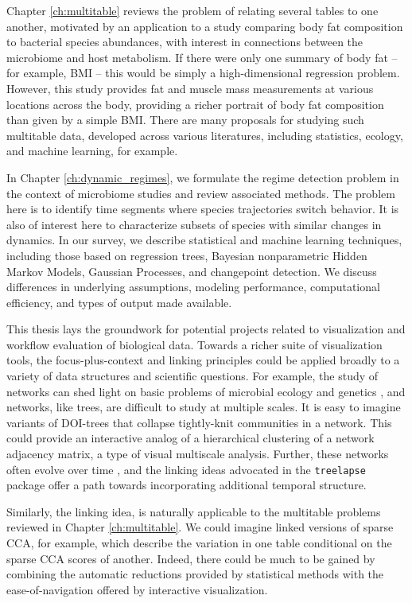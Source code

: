 Chapter \ref{ch:multitable} reviews the problem of relating several tables to
one another, motivated by an application to a study comparing body fat
composition to bacterial species abundances, with interest in connections
between the microbiome and host metabolism. If there were only one summary of
body fat -- for example, BMI -- this would be simply a high-dimensional regression
problem. However, this study provides fat and muscle mass measurements at
various locations across the body, providing a richer portrait of body
fat composition than given by a simple BMI. There are many proposals for studying such
multitable data, developed across various literatures, including statistics,
ecology, and machine learning, for example.

In Chapter \ref{ch:dynamic_regimes}, we formulate the regime detection problem
in the context of microbiome studies and review associated methods. The problem
here is to identify time segments where species trajectories switch behavior. It
is also of interest here to characterize subsets of species with similar changes
in dynamics. In our survey, we describe statistical and machine learning
techniques, including those based on regression trees, Bayesian nonparametric
Hidden Markov Models, Gaussian Processes, and changepoint detection. We discuss
differences in underlying assumptions, modeling performance, computational
efficiency, and types of output made available.

This thesis lays the groundwork for potential projects related to visualization
and workflow evaluation of biological data. Towards a richer suite of
visualization tools, the focus-plus-context and linking principles could be
applied broadly to a variety of data structures and scientific questions. For
example, the study of networks can shed light on basic problems of microbial
ecology and genetics \citep{akutsu2000inferring, coyte2015ecology}, and
networks, like trees, are difficult to study at multiple scales. It is easy to
imagine variants of DOI-trees that collapse tightly-knit communities in a
network. This could provide an interactive analog of a hierarchical clustering
of a network adjacency matrix, a type of visual multiscale analysis. Further,
these networks often evolve over time \citep{kolar2010estimating}, and the
linking ideas advocated in the \texttt{treelapse} package offer a path towards
incorporating additional temporal structure.

Similarly, the linking idea, is naturally applicable to the multitable problems
reviewed in Chapter \ref{ch:multitable}. We could imagine linked versions of
sparse CCA, for example, which describe the variation in one table conditional
on the sparse CCA scores of another. Indeed, there could be much to be gained by
combining the automatic reductions provided by statistical methods with the
ease-of-navigation offered by interactive visualization.

